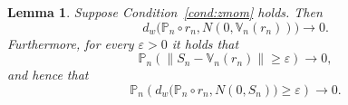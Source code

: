 \documentclass[preprint]{imsart}
\newtheorem{lemma}[theorem]{Lemma}
\numberwithin{equation}{section}
\begin{document}
\begin{lemma}\label{lemma:zmom}
Suppose Condition~\ref{cond:zmom} holds. Then
%
\begin{equation}
d_w \big( \mathbb{P}_n \circ r_n, N(0, \mathbb{V}_n(r_n)) \big) \to 0.
\end{equation}
%
Furthermore, for every $\varepsilon > 0$ it holds that
%
\begin{equation}\label{eqn:empvar}
\mathbb{P}_n \left(\big \|S_n -\mathbb{V}_n(r_n) \big \| \geq \varepsilon   \right) \to 0,
\end{equation}
%
and hence that
%
\begin{equation}\label{eqn:empclt}
\mathbb{P}_n \left( d_w \big( \mathbb{P}_n \circ r_n, N(0, S_n) \big) \geq \varepsilon\right) \to 0.
\end{equation}
%
 
\end{lemma}
\end{document}
